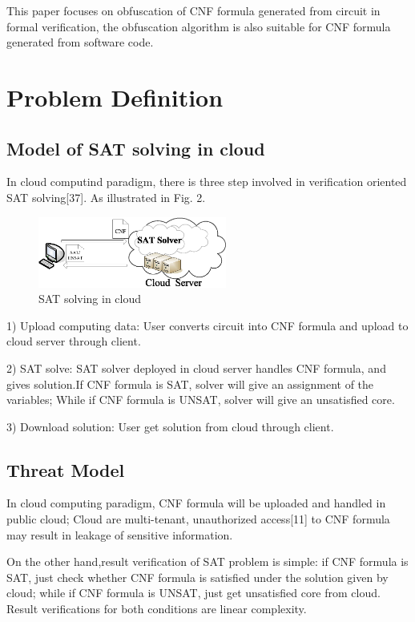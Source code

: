 \documentclass[runningheads,a4paper]{llncs}
\begin{document}
This paper focuses on obfuscation of CNF formula generated from circuit in formal verification, the obfuscation algorithm is also suitable for CNF formula generated from software code.

\section{Problem Definition}
\subsection{Model of SAT solving in cloud}

In cloud computind paradigm, there is three step involved in verification oriented SAT solving[37].
As illustrated in Fig. 2.
\begin{figure}
\centering
\includegraphics[width=6.2cm]{a2}
\caption{SAT solving in cloud }
\end{figure}

1)  Upload computing data: User converts circuit into CNF formula and upload to cloud server through client.

2)  SAT solve: SAT solver deployed in cloud server handles CNF formula, and gives solution.If CNF formula is SAT, solver will give an assignment of the variables; While if CNF formula is UNSAT, solver will give an unsatisfied core.{}

3)  Download solution: User get solution from cloud through client.{}
\subsection{Threat Model}

In cloud computing paradigm, CNF formula will be uploaded and handled in public cloud; 
Cloud are multi-tenant, unauthorized access[11] to CNF formula may result in leakage of sensitive information.

On the other hand,result verification of SAT problem is simple: if CNF formula is SAT, just check whether CNF formula is satisfied under the solution given by cloud;
while if CNF formula is UNSAT, just get unsatisfied core from cloud. Result verifications for both conditions are linear complexity.
\end{document}
